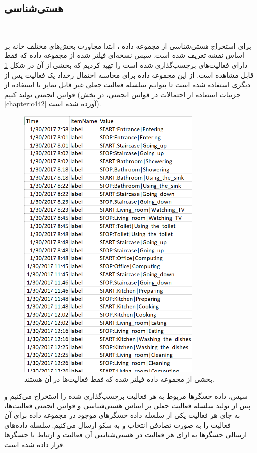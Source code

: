 \subsection{هستی‌شناسی}‌

برای استخراج هستی‌شناسی از مجموعه داده ، ابتدا مجاورت بخش‌های مختلف خانه بر اساس نقشه تعریف شده است. سپس نسخه‌ای فیلتر شده از مجموعه داده که فقط دارای فعالیت‌های برچسب‌گذاری شده است را تهیه کردیم که بخشی از آن در شکل \ref{fig:fO4H4} قابل مشاهده است. از این مجموعه داده برای محاسبه احتمال رخداد یک فعالیت پس از دیگری استفاده شده است تا بتوانیم سلسله فعالیت جعلی غیر قابل تمایز با استفاده از قوانین انجمنی تولید کنیم (جزئیات استفاده از احتمالات در قوانین انجمنی، در بخش \ref{chapter:c442} آورده شده است). 

\begin{figure}[H]
\centerline{\includegraphics[width=0.8\textwidth]{figs/fO4H4.png}}
\caption{بخشی از مجموعه داده فیلتر شده  که فقط فعالیت‌ها در آن هستند.}
\label{fig:fO4H4}
\end{figure}

سپس، داده حسگرها مربوط به هر فعالیت برچسب‌گذاری شده را استخراج می‌کنیم و پس از تولید سلسله فعالیت جعلی بر اساس هستی‌شناسی و  قوانین انجمنی فعالیت‌ها، به جای هر فعالیت یکی از سلسله داده حسگرهای موجود در مجموعه داده برای آن فعالیت را به صورت تصادفی انتخاب و به سکو ارسال می‌کنیم. سلسله داده‌های ارسالی حسگرها به ازای هر فعالیت در هستی‌شناسی آن فعالیت و ارتباط با حسگرها قرار داده شده است.

